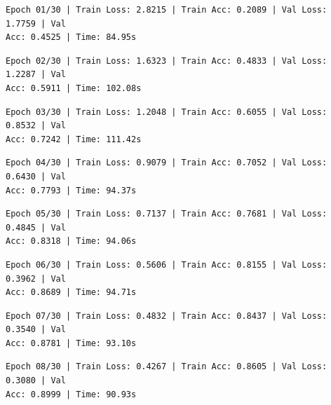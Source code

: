 \documentclass[11pt]{article}
\begin{document}
    \begin{Verbatim}[commandchars=\\\{\}]
Epoch 01/30 | Train Loss: 2.8215 | Train Acc: 0.2089 | Val Loss: 1.7759 | Val
Acc: 0.4525 | Time: 84.95s
    \end{Verbatim}

    \begin{Verbatim}[commandchars=\\\{\}]
Epoch 02/30 | Train Loss: 1.6323 | Train Acc: 0.4833 | Val Loss: 1.2287 | Val
Acc: 0.5911 | Time: 102.08s
    \end{Verbatim}

    \begin{Verbatim}[commandchars=\\\{\}]
Epoch 03/30 | Train Loss: 1.2048 | Train Acc: 0.6055 | Val Loss: 0.8532 | Val
Acc: 0.7242 | Time: 111.42s
    \end{Verbatim}

    \begin{Verbatim}[commandchars=\\\{\}]
Epoch 04/30 | Train Loss: 0.9079 | Train Acc: 0.7052 | Val Loss: 0.6430 | Val
Acc: 0.7793 | Time: 94.37s
    \end{Verbatim}

    \begin{Verbatim}[commandchars=\\\{\}]
Epoch 05/30 | Train Loss: 0.7137 | Train Acc: 0.7681 | Val Loss: 0.4845 | Val
Acc: 0.8318 | Time: 94.06s
    \end{Verbatim}

    \begin{Verbatim}[commandchars=\\\{\}]
Epoch 06/30 | Train Loss: 0.5606 | Train Acc: 0.8155 | Val Loss: 0.3962 | Val
Acc: 0.8689 | Time: 94.71s
    \end{Verbatim}

    \begin{Verbatim}[commandchars=\\\{\}]
Epoch 07/30 | Train Loss: 0.4832 | Train Acc: 0.8437 | Val Loss: 0.3540 | Val
Acc: 0.8781 | Time: 93.10s
    \end{Verbatim}

    \begin{Verbatim}[commandchars=\\\{\}]
Epoch 08/30 | Train Loss: 0.4267 | Train Acc: 0.8605 | Val Loss: 0.3080 | Val
Acc: 0.8999 | Time: 90.93s
    \end{Verbatim}
\end{document}
